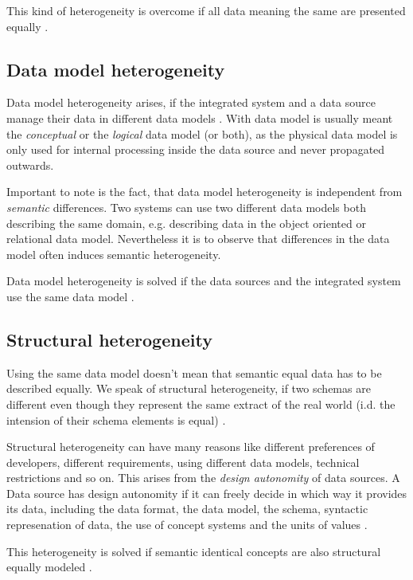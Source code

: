 This kind of heterogeneity is overcome if all data meaning the same are presented equally \cite[p. 61]{DBLP:books/dp/LeserN2006}.

\subsection{Data model  heterogeneity}
Data model heterogeneity arises, if the integrated system and a data source manage their data in different data models \cite[p. 65]{DBLP:books/dp/LeserN2006}. With data model is usually meant the \emph{conceptual} or the \emph{logical} data model (or both), as the physical data model is only used for internal processing inside the data source and never propagated outwards.

Important to note is the fact, that data model heterogeneity is independent from \emph{semantic} differences. Two systems can use two different data models both describing the same domain, e.g. describing data in the object oriented or relational data model. Nevertheless it is to observe that differences in the data model often induces semantic heterogeneity.

Data model heterogeneity is solved if the data sources and the integrated system use the same data model \cite[p. 61]{DBLP:books/dp/LeserN2006}.

\subsection{Structural  heterogeneity}
Using the same data model doesn't mean that semantic equal data has to be described equally. We speak of structural heterogeneity, if two schemas are different even though they represent the same extract of the real world (i.d. the intension of their schema elements is equal) \cite[p. 67]{DBLP:books/dp/LeserN2006}. 

Structural heterogeneity can have many reasons like different preferences of developers, different requirements, using different data models, technical restrictions and so on. This arises from the \textit{design autonomity} of data sources. A Data source has design autonomity if it can freely decide in which way it provides its data, including the data format, the data model, the schema, syntactic represenation of data, the use of concept systems and the units of values \cite[p.55]{DBLP:books/dp/LeserN2006}.

This heterogeneity is solved if semantic identical concepts are also structural equally modeled  \cite[p. 61]{DBLP:books/dp/LeserN2006}.

